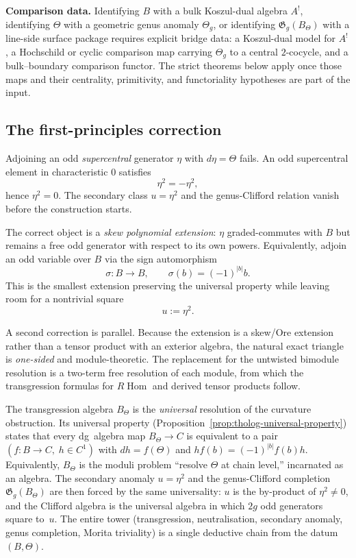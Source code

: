 \medskip

\noindent\textbf{Comparison data.}
Identifying \(B\) with a bulk Koszul-dual algebra \(A^{!}\),
identifying \(\Theta\) with a geometric genus anomaly
\(\Theta_{g}\), or identifying
\(\mathfrak{G}_{g}(B_{\Theta})\) with a line-side surface package
requires explicit bridge data:
a Koszul-dual model for \(A^{!}\), a Hochschild or cyclic comparison
map carrying \(\Theta_g\) to a central \(2\)-cocycle, and a
bulk--boundary comparison functor.  The strict theorems below apply
once those maps and their centrality, primitivity, and functoriality
hypotheses are part of the input.

\subsection{The first-principles correction}
\label{subsec:tholog-first-principles-correction}

Adjoining an odd \emph{supercentral} generator \(\eta\) with \(d\eta=\Theta\) fails. An odd supercentral element in characteristic \(0\) satisfies
\[
\eta^{2}=-\eta^{2},
\]
hence \(\eta^{2}=0\). The secondary class \(u=\eta^2\) and the genus-Clifford relation vanish before the construction starts.

The correct object is a \emph{skew polynomial extension}: \(\eta\) graded-commutes with \(B\) but remains a free odd generator with respect to its own powers. Equivalently, adjoin an odd variable over \(B\) via the sign automorphism
\[
\sigma:B\longrightarrow B,\qquad \sigma(b)=(-1)^{|b|}b.
\]
This is the smallest extension preserving the universal property while leaving room for a nontrivial square
\[
u:=\eta^{2}.
\]

A second correction is parallel. Because the extension is a skew/Ore extension rather than a tensor product with an exterior algebra, the natural exact triangle is \emph{one-sided} and module-theoretic. The replacement for the untwisted bimodule resolution is a two-term free resolution of each module, from which the transgression formulas for \(R\!\operatorname{Hom}\) and derived tensor products follow.

\begin{remark}[Inevitability]
\label{rem:tholog-inevitability}
The transgression algebra $B_\Theta$ is the \emph{universal} resolution of the curvature obstruction. Its universal property (Proposition~\ref{prop:tholog-universal-property}) states that every dg~algebra map $B_\Theta \to C$ is equivalent to a pair $(f\colon B \to C,\; h \in C^1)$ with $dh = f(\Theta)$ and $hf(b) = (-1)^{|b|}f(b)h$. Equivalently, $B_\Theta$ is the moduli problem ``resolve $\Theta$ at chain level,'' incarnated as an algebra. The secondary anomaly $u = \eta^2$ and the genus-Clifford completion $\mathfrak G_g(B_\Theta)$ are then forced by the same universality: $u$ is the by-product of $\eta^2 \ne 0$, and the Clifford algebra is the universal algebra in which $2g$ odd generators square to~$u$. The entire tower (transgression, neutralisation, secondary anomaly, genus completion, Morita triviality) is a single deductive chain from the datum $(B, \Theta)$.
\end{remark}

